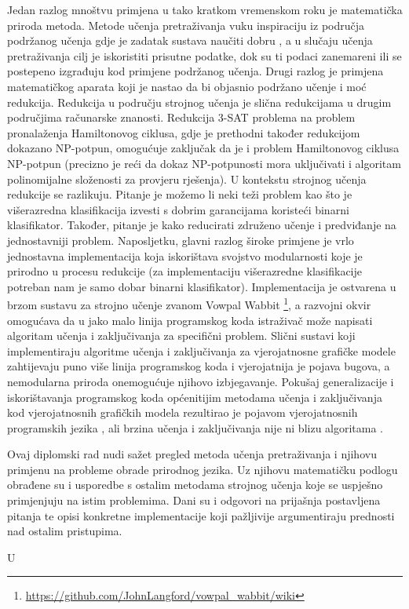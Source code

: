 Jedan razlog mnoštvu primjena u tako kratkom vremenskom roku je matematička
priroda metoda. Metode učenja pretraživanja vuku inspiraciju iz područja
podržanog učenja  gdje je zadatak sustava naučiti
dobru , a u slučaju učenja
pretraživanja cilj je iskoristiti prisutne podatke, dok su ti podaci zanemareni
ili se postepeno izgrađuju kod primjene podržanog učenja. Drugi razlog je
primjena matematičkog aparata koji je nastao da bi objasnio podržano učenje i
moć redukcija. Redukcija u području strojnog učenja je slična redukcijama u
drugim područjima računarske znanosti. Redukcija 3-SAT problema na problem
pronalaženja Hamiltonovog ciklusa, gdje je prethodni također redukcijom dokazano
NP-potpun, omogućuje zaključak da je i problem Hamiltonovog ciklusa NP-potpun
(precizno je reći da dokaz NP-potpunosti mora uključivati i algoritam
polinomijalne složenosti za provjeru rješenja). U kontekstu strojnog učenja
redukcije se razlikuju. Pitanje je možemo li neki teži problem kao što je
višerazredna klasifikacija izvesti s dobrim garancijama koristeći binarni
klasifikator. Također, pitanje je kako reducirati združeno učenje i predviđanje
 na jednostavniji problem. Naposljetku,
glavni razlog široke primjene je vrlo jednostavna implementacija koja
iskorištava svojstvo modularnosti koje je prirodno u procesu redukcije (za
implementaciju višerazredne klasifikacije potreban nam je samo dobar binarni
klasifikator). Implementacija je ostvarena u brzom sustavu za strojno učenje
zvanom Vowpal Wabbit
\footnote{\url{https://github.com/JohnLangford/vowpal_wabbit/wiki}}, a
\lts{} razvojni okvir omogućava da u jako malo linija programskog koda
istraživač može napisati algoritam učenja i zaključivanja za specifični problem.
Slični sustavi koji implementiraju algoritme učenja i zaključivanja za
vjerojatnosne grafičke modele zahtijevaju puno više linija programskog koda i
vjerojatnija je pojava bugova, a nemodularna priroda onemogućuje njihovo
izbjegavanje. Pokušaj generalizacije i iskorištavanja programskog koda
općenitijim metodama učenja i zaključivanja kod vjerojatnosnih grafičkih modela
rezultirao je pojavom vjerojatnosnih programskih jezika , ali brzina učenja i zaključivanja nije ni blizu
algoritama \lts{}.

Ovaj diplomski rad nudi sažet pregled metoda učenja pretraživanja i njihovu
primjenu na probleme obrade prirodnog jezika. Uz njihovu matematičku podlogu
obrađene su i usporedbe s ostalim metodama strojnog učenja koje se uspješno
primjenjuju na istim problemima. Dani su i odgovori na prijašnja postavljena
pitanja te opisi konkretne implementacije koji pažljivije argumentiraju
prednosti nad ostalim pristupima.

U 
